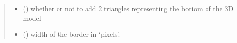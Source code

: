 \documentclass[letterpaper,10pt,english]{sphinxmanual}
\begin{document}
\begin{fulllineitems}
\begin{quote}
\begin{description}
\begin{itemize}
\item {} 
\sphinxAtStartPar
{} () \textendash{} whether or not to add 2 triangles representing the bottom of the 3D model

\item {} 
\sphinxAtStartPar
{} () \textendash{} width of the border in ‘pixels’.

\end{itemize}

\end{description}\end{quote}

\end{fulllineitems}

\end{document}
